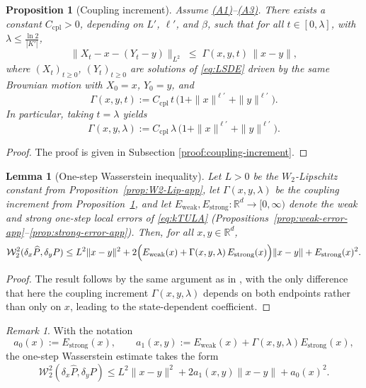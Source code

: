 \documentclass[11pt,a4paper,reqno]{amsart}
\theoremstyle{plain}
\newtheorem{lemma}{Lemma}
\newtheorem{proposition}{Proposition}
\theoremstyle{definition}
\theoremstyle{remark}
\newtheorem{remark}{Remark}
\newcommand{\R}{\mathbb{R}}
\newcommand{\W}{\mathcal{W}_2}
\begin{document}
\begin{proposition}[Coupling increment]
\label{prop:coupling-increment-app}
Assume \hyperref[ass:PJG]{\textup{(A1)}}--\hyperref[ass:OSL]{\textup{(A3)}}. There exists a constant \(C_{\mathrm{cpl}}>0\), depending on $L'$, $\ell'$, and $\beta$, such that for all
\(t\in[0,\lambda]\), with \(\lambda\le \frac{\ln 2}{|K'|}\),
\[
  \|X_t - x - (Y_t - y)\|_{L^2}
  \;\le\;
  \Gamma(x,y,t)\,\|x-y\|,
\]
where $(X_t)_{t\ge0}$, $(Y_t)_{t\ge0}$ are solutions of \eqref{eq:LSDE} driven by the same Brownian motion with $X_0=x$, $Y_0=y$, and
\[
  \Gamma(x,y,t)
  := C_{\mathrm{cpl}}\,t\,\bigl(1+\|x\|^{\ell'}+\|y\|^{\ell'}\bigr).
\]
In particular, taking \(t=\lambda\) yields
\[
  \Gamma(x,y,\lambda)
  := C_{\mathrm{cpl}}\,\lambda\,\bigl(1+\|x\|^{\ell'}+\|y\|^{\ell'}\bigr).
\]
\end{proposition}
\begin{proof}
The proof is given in Subsection \ref{proof:coupling-increment}.
\end{proof}

\begin{lemma}[One-step Wasserstein inequality]\label{lem:one-step-w2}
Let $L>0$ be the $W_2$-Lipschitz constant from Proposition~\ref{prop:W2-Lip-app}, let $\Gamma(x,y,\lambda)$ be the coupling increment from Proposition~\ref{prop:coupling-increment-app}, and let $E_{\mathrm{weak}},E_{\mathrm{strong}}:\R^d\to[0,\infty)$ denote the weak and strong one-step local errors of \eqref{eq:kTULA} (Propositions~\ref{prop:weak-error-app}--\ref{prop:strong-error-app}). Then, for all $x,y\in\R^d$,
\[
  \W^2(\delta_x \widehat P,\delta_y P)
  \le
  L^2\|x-y\|^2
  +2\Bigl(E_{\mathrm{weak}}(x)+\Gamma(x,y,\lambda)\,E_{\mathrm{strong}}(x)\Bigr)\|x-y\|
  +E_{\mathrm{strong}}(x)^2.
\]
\end{lemma}
\begin{proof}
The result follows by the same argument as in \cite{chewi2024local}, with the only difference that here the coupling increment $\Gamma(x,y,\lambda)$ depends on both endpoints rather than only on $x$, leading to the state-dependent coefficient.
\end{proof}

\begin{remark}
With the notation
\[
a_0(x):=E_{\mathrm{strong}}(x),
\qquad
a_1(x,y):=E_{\mathrm{weak}}(x)+\Gamma(x,y,\lambda)E_{\mathrm{strong}}(x),
\]
the one-step Wasserstein estimate takes the form
\[
  \W^2(\delta_x \widehat P,\delta_y P)
  \le
  L^2\|x-y\|^2
  +2a_1(x,y)\|x-y\|
  +a_0(x)^2.
\]
\end{remark}
\end{document}

